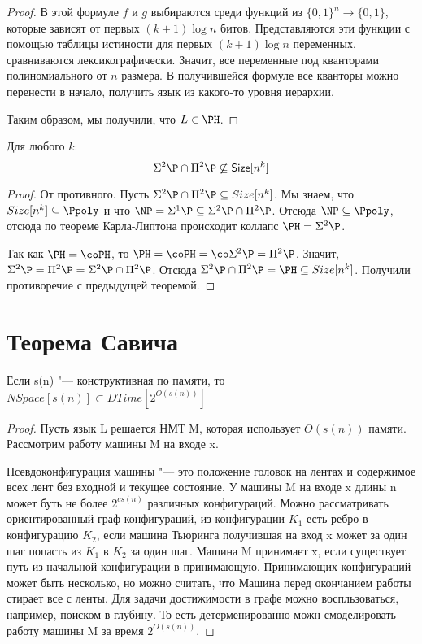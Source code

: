 \begin{proof}
	В этой формуле $f$ и $g$ выбираются среди функций из $\{0, 1\}^n \to \{0, 1\}$, которые
	зависят от первых $(k + 1)\log n$ битов.
	Представляются эти  функции с помощью таблицы истиности для первых $(k + 1)\log n$ переменных,
	сравниваются лексикографически.
	Значит, все переменные под кванторами полиномиального от $n$ размера.
	В получившейся формуле все кванторы можно перенести в начало, получить
	язык из какого-то уровня иерархии.

	Таким образом, мы получили, что $L \in \PH$.
\end{proof}

\begin{conseq}
	Для любого $k$:
	\[ \Sigma^2 \P \cap \Pi^2 \P \not\subseteq \mathsf{Size}[n^k] \]
\end{conseq}
\begin{proof}
	От противного.
	Пусть $\Sigma^2 \P \cap \Pi^2 \P \subseteq Size[n^k]$.
	Мы знаем, что $Size[n^k] \subseteq \Ppoly$ и
	что $\NP = \Sigma^1 \P \subseteq \Sigma^2 \P \cap \Pi^2 \P$.
	Отсюда $\NP \subseteq \Ppoly$, отсюда по теореме Карла-Липтона происходит
	коллапс $\PH = \Sigma^2 \P$.

	Так как $\PH=\coPH$, то $\PH=\coPH=\co\Sigma^2\P=\Pi^2\P$.
	Значит, $\Sigma^2\P=\Pi^2\P=\Sigma^2\P\cap\Pi^2\P$.
	Отсюда $\Sigma^2 \P \cap \Pi^2 \P = \PH \subseteq Size[n^k]$.
	Получили противоречие с предыдущей теоремой.
\end{proof}

\section{Теорема Савича}
\begin{theorem}
	Если s(n) "--- конструктивная по памяти, то 
	$NSpace[s(n)] \subset DTime[2^{O(s(n))}]$
\end{theorem}
\begin{proof}
	Пусть язык L решается НМТ M, которая использует $O(s(n))$ памяти. 
	Рассмотрим работу машины M на входе x. 

	Псевдоконфигурация машины "--- это положение головок на лентах 
	и содержимое всех лент без входной и текущее состояние. У машины 
	M на входе x длины n может буть не более $2^{cs(n)}$ различных
	конфигураций.  Можно рассматривать ориентированный граф конфигураций, 
	из конфигурации $K_1$ есть ребро в конфигурацию $K_2$, если машина 
	Тьюринга получившая на вход x может за один шаг попасть из $K_1$ в 
	$K_2$ за один шаг. Машина M принимает x, если существует путь из
	начальной конфигурации в принимающую. Принимающих конфигураций
	может быть несколько, но можно считать, что Машина перед окончанием работы
	стирает все с ленты. Для задачи достижимости в графе можно воспльзоваться,
	например, поиском в глубину. То есть детерменированно
	можн смоделировать работу машины M за время $2^{O(s(n))}$.
\end{proof}

